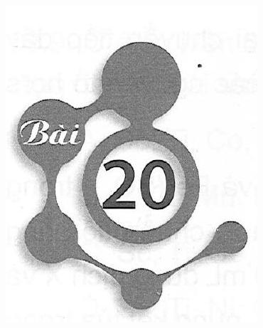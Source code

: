 \documentclass[10pt]{article}
\begin{document}
\includegraphics[max width=\textwidth, center]{2025_10_23_de6f5713836e4e91b3c8g-126}
\end{document}
